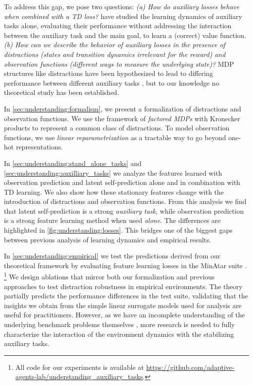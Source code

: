 To address this gap, we pose two questions: \emph{(a) How do auxiliary losses behave when combined with a TD loss?} \textcite{tang2022understanding,lelan2022generalization,tang2023towards} have studied the learning dynamics of auxiliary tasks alone, evaluating their performance without addressing the interaction between the auxiliary task and the main goal, to learn a (correct) value function. \emph{(b) How can we describe the behavior of auxiliary losses in the presence of distractions (states and transition dynamics irrelevant for the reward) and observation functions (different ways to measure the underlying state)?} MDP structures like distractions have been hypothesized to lead to differing performance between different auxiliary tasks \parencite{ni2024bridging}, but to our knowledge no theoretical study has been established.


In \autoref{sec:understanding:formalism}, we present a formalization of distractions and observation functions. We use the framework of \emph{factored MDPs} \parencite{boutilier2000stochastic} with Kronecker products \parencite{mahadevan2009learning} to represent a common class of distractions. To model observation functions, we use \emph{linear reparametrization} as a tractable way to go beyond one-hot representations. 

In \autoref{sec:understanding:stand_alone_tasks} and \autoref{sec:understanding:auxilliary_tasks} we analyze the features learned with observation prediction and latent self-prediction alone and in combination with TD learning. 
We also show how these stationary features change with the introduction of distractions and observation functions.
From this analysis we find that latent self-prediction is a strong \emph{auxiliary task}, while observation prediction is a strong feature learning method when used \emph{alone}.
The differences are highlighted in \autoref{fig:understanding:losses}.
This bridges one of the biggest gaps between previous analysis of learning dynamics and empirical results.

In \autoref{sec:understanding:empirical} we test the predictions derived from our theoretical framework by evaluating feature learning losses in the MinAtar suite \parencite{young19minatar}.
\footnote{All code for our experiments is available at \url{https://github.com/adaptive-agents-lab/understanding_auxiliary_tasks}.}
We design ablations that mirror both our formalization and previous approaches to test distraction robustness in empirical environments. 
The theory partially predicts the performance differences in the test suite, validating that the insights we obtain from the simple linear surrogate models used for analysis are useful for practitioners.
However, as we have an incomplete understanding of the underlying benchmark problems themselves \parencite{voelcker2024can}, more research is needed to fully characterize the interaction of the environment dynamics with the stabilizing auxiliary tasks.

